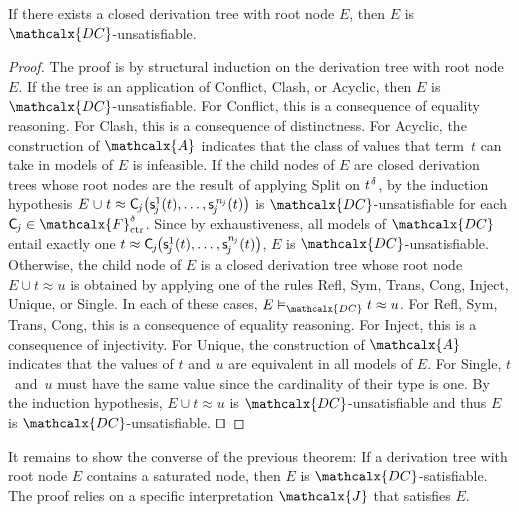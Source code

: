 \documentclass[smallcondensed,draft]{svjour3}
\newcommand\DISC[1]{t \teq \const{C}_{#1}\negvthinspace\bigl(\const s^1_{#1}( t ), \ldots,\const s^{n_{#1}}_{#1}( t )\bigr)}
\newcommand\typ[1]{^{\vthinspace #1}}
\newcommand\afterDot{\;} %
\newcommand\const[1]{\textsf{#1}}
\newcommand\xqed{{\hfill$\scriptstyle\squareforqed$}}
\newcommand{\Ec}{E}
\newcommand{\rn}[1]{\textsf{#1}}
\newcommand{\teq}{\approx}
\newcommand{\J}{\mathcalx{J}}
\newcommand{\Val}{\mathcalx{A}\vvthinspace}
\newcommand{\thD}{\mathcalx{DC}}
\newcommand\Funcs{\mathcalx{F}}
\newcommand\Ctr{\Funcs_{\smash{\mathrm{ctr}}}}
\newcommand\vvthinspace{\kern+0.041667em}
\newcommand\vthinspace{\kern+0.083333em}
\newcommand\negvthinspace{\kern-0.083333em}
\begin{document}
\begin{theorem}%
\label{thm:rs}%
\afterDot
If there exists a closed derivation tree with root node\/ $\Ec$, then\/ $\Ec$ is $\thD$-unsatisfiable.
\end{theorem}
\begin{proof}
The proof is by structural induction on the derivation tree with root node $\Ec$.
If the tree is an application of \rn{Conflict}, \rn{Clash}, or \rn{Acyclic},
then $\Ec$ is $\thD$-unsatisfiable.
For \rn{Conflict}, this is a consequence of equality reasoning.
For \rn{Clash}, this is a consequence of distinctness.
For \rn{Acyclic}, the construction of $\Val$ indicates that the class of values that term~$t$ can take in models of $\Ec$ is infeasible.
If the child nodes of $\Ec$ are closed derivation trees
whose root nodes are the result of applying \rn{Split} on $t\typ{\delta}$,
by the induction hypothesis $\Ec \mathrel\cup t \teq \smash{\const C_{\negvthinspace j}\bigl( \const s^1_{\negvthinspace j}( t ), \ldots, \const s^{\,\smash{n_{\negvthinspace j}}}_{\negvthinspace j}( t ) \bigr)}$ is
$\thD$-unsatisfiable
for each $\const C_{\negvthinspace j} \in \smash{\Ctr^\delta}$.
Since by exhaustiveness, all models of $\thD$ entail exactly one
$\DISC{\negvthinspace j}$,
$\Ec$ is $\thD$-unsatisfiable.
Otherwise, the child node of $\Ec$ is a closed derivation tree
whose root
node $\Ec \mathrel\cup t \teq u$ is obtained by applying one of the rules \rn{Refl}, \rn{Sym}, \rn{Trans}, \rn{Cong}, \rn{Inject}, \rn{Unique}, or \rn{Single}.
In each of these cases, $\Ec \vDash_{\thD} t \teq u$.
For \rn{Refl}, \rn{Sym}, \rn{Trans}, \rn{Cong}, this is a consequence of equality reasoning.
For \rn{Inject}, this is a consequence of injectivity.
For \rn{Unique}, the construction of $\Val$ indicates that the values of $t$ and $u$ are equivalent in all models of $\Ec$.
For \rn{Single}, $t$~and~$u$ must have the same value since the cardinality of their type is one.
By the induction hypothesis, $\Ec \mathrel\cup t \teq u$ is $\thD$-unsatisfiable
and thus $\Ec$ is $\thD$-unsatisfiable.
\xqed
\end{proof}

It remains to show the converse of the previous theorem: If a derivation tree
with root node $\Ec$ contains a saturated node, then $\Ec$ is
$\thD$-satisfiable.
The proof relies on a specific interpretation $\J$ that satisfies $\Ec$.
\end{document}
